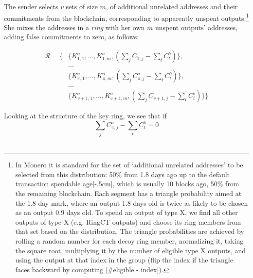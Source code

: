The sender selects $v$ sets of size $m$, of additional unrelated addresses and their commitments from the blockchain, corresponding to apparently unspent outputs.\footnote{\label{input-selection}In Monero it is standard for the set of `additional unrelated addresses' to be selected from this distribution: 50\% from 1.8 days ago up to the default transaction spendable age[-.5cm], which is usually 10 blocks ago, 50\% from the remaining blockchain. Each segment has a triangle probability aimed at the 1.8 day mark, where an output 1.8 days old is twice as likely to be chosen as an output 0.9 days old. To spend an output of type X, we find all other outputs of type X (e.g. RingCT outputs) and choose its ring members from that set based on the distribution. The triangle probabilities are achieved by rolling a random number for each decoy ring member, normalizing it, taking the square root, multiplying it by the number of eligible type X outputs, and using the output at that index in the group (flip the index if the triangle faces backward by computing [\#eligible - index]).} She mixes the addresses in a {\em ring} with her own $m$ unspent outputs' addresses, adding false commitments to zero, as follows:

\begin{align*}
  \mathcal{R} = \{ &\{K_{1,1}^o,...,K_{1,m}^o, (\sum\limits_j C_{1, j} - \sum\limits_t C^b_{t})\}, \\
  &... \\
  &\{K_{\pi,1}^o,...,K_{\pi,m}^o, (\sum\limits_j C^a_{\pi, j} - \sum\limits_t C^b_{t})\}, \\
  &... \\
  &\{K_{v+1,1}^o,...,K_{v+1,m}^o, (\sum\limits_j C_{v+1, j} - \sum\limits_t C^b_{t})\}\}
\end{align*}

Looking at the structure of the key ring, we see that if \vspace{.2cm}
\[\sum\limits_j C^a_{\pi, j} -\sum\limits_t C^b_{t} = 0\] \\\vspace{-.7cm}

